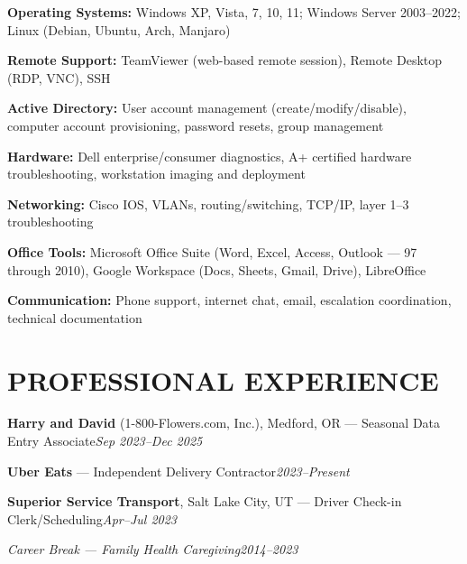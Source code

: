 \documentclass[9pt,letterpaper]{extarticle}
\begin{document}
\noindent\textbf{Operating Systems:} Windows XP, Vista, 7, 10, 11; Windows Server 2003--2022; Linux (Debian, Ubuntu, Arch, Manjaro)

\noindent\textbf{Remote Support:} TeamViewer (web-based remote session), Remote Desktop (RDP, VNC), SSH

\noindent\textbf{Active Directory:} User account management (create/modify/disable), computer account provisioning, password resets, group management

\noindent\textbf{Hardware:} Dell enterprise/consumer diagnostics, A+ certified hardware troubleshooting, workstation imaging and deployment

\noindent\textbf{Networking:} Cisco IOS, VLANs, routing/switching, TCP/IP, layer 1--3 troubleshooting

\noindent\textbf{Office Tools:} Microsoft Office Suite (Word, Excel, Access, Outlook --- 97 through 2010), Google Workspace (Docs, Sheets, Gmail, Drive), LibreOffice

\noindent\textbf{Communication:} Phone support, internet chat, email, escalation coordination, technical documentation

\section*{PROFESSIONAL EXPERIENCE}

\noindent\textbf{Harry and David} (1-800-Flowers.com, Inc.), Medford, OR --- Seasonal Data Entry Associate\hfill\textit{Sep 2023--Dec 2025}

\vspace{3pt}
\noindent\textbf{Uber Eats} --- Independent Delivery Contractor\hfill\textit{2023--Present}

\vspace{3pt}
\noindent\textbf{Superior Service Transport}, Salt Lake City, UT --- Driver Check-in Clerk/Scheduling\hfill\textit{Apr--Jul 2023}

\vspace{3pt}
\noindent\textit{Career Break --- Family Health Caregiving}\hfill\textit{2014--2023}
\end{document}
